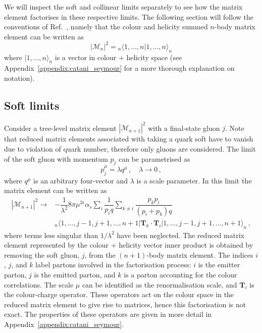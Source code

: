 \documentclass[main.tex]{subfiles}
\begin{document}
    We will inspect the soft and collinear limits separately
    to see how the matrix element factorises in these respective
    limits.
    The following section will follow the conventions
    of Ref.~\cite{Catani:1996vz}, namely that the colour and
    helicity summed $n$-body matrix element can be written as
    \begin{equation}\label{eqn:CS_matrix_element}
        |\mathcal{M}_{n}|^{2} = {}_{n}\langle 1, \ldots, n | 1, \ldots, n \rangle_{n}
    \end{equation}
    where $| 1, \ldots, n \rangle_{n}$ is a vector
    in colour + helicity space (see Appendix~\ref{appendix:catani_seymour}
    for a more thorough explanation on notation).

\subsection{Soft limits}\label{sec:me_soft}
    Consider a tree-level matrix element $|\mathcal{M}_{n+1}|^{2}$
    with a final-state gluon $j$. Note that reduced matrix
    elements associated with taking a quark soft have to vanish
    due to violation of quark number, therefore only gluons
    are considered.
    The limit of the soft gluon with momentum
    $p_{j}$ can be parametrised as
    \begin{equation}\label{eqn:soft_parametrisation}
        p_{j}^{\mu} = \lambda q^{\mu} \, , \quad \lambda \rightarrow 0 \, ,
    \end{equation}
    where $q^{\mu}$ is an arbitrary four-vector and $\lambda$
    is a scale parameter. In this limit the matrix element
    can be written as
    \begin{equation}\label{eqn:soft_factorisation}
        \begin{split}
        |\mathcal{M}_{n+1}|^{2} \rightarrow &-\dfrac{1}{\lambda^{2}}8\pi \mu^{2\epsilon}\alpha_{s} \sum_{i}\dfrac{1}{p_{i}q} \sum_{k \neq i} \dfrac{p_{k}p_{i}}{(p_{i} + p_{k})q} \\
        &{}_{n}\langle 1, \ldots, j-1, j+1, \ldots, n+1 | \bm{T}_{k} \cdot \bm{T}_{i} | 1, \ldots, j-1, j+1, \ldots, n+1 \rangle_{n} \, ,
        \end{split}
    \end{equation}
    where terms less singular than $1 / \lambda^{2}$ have been
    neglected. The reduced matrix element represented by the
    colour + helicity vector inner product is obtained by removing
    the soft gluon, $j$, from the $(n+1)$-body matrix element.
    The indices $i$, $j$, and $k$ label partons involved
    in the factorisation process: $i$ is the emitter parton,
    $j$ is the emitted parton, and $k$ is a parton accounting
    for the colour correlations.
    The scale $\mu$ can be identified as the
    renormalisation scale, and $\bm{T}_{i}$ is the colour-charge
    operator. These operators act on the colour space in the
    reduced matrix element to give rise to matrices,
    hence this factorisation is not exact. The properties
    of these operators are given in more detail in
    Appendix~\ref{appendix:catani_seymour}.
\end{document}
